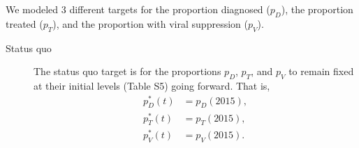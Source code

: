 \documentclass{article}
\begin{document}
We modeled 3 different targets for the proportion diagnosed ($p_D$), the
proportion treated ($p_T$), and the proportion with viral suppression ($p_V$).
\begin{description}
\item[Status quo] The status quo target is for the proportions $p_D$,
  $p_T$, and $p_V$ to remain fixed at their initial levels (Table S5)
  going forward. That is,
  \begin{equation}
    \label{status_quo_target}
    \begin{split}
      p_D^*(t) &= p_D(2015), \\
      p_T^*(t) &= p_T(2015), \\
      p_V^*(t) &= p_V(2015).
    \end{split}
  \end{equation}


\end{description}
\end{document}
